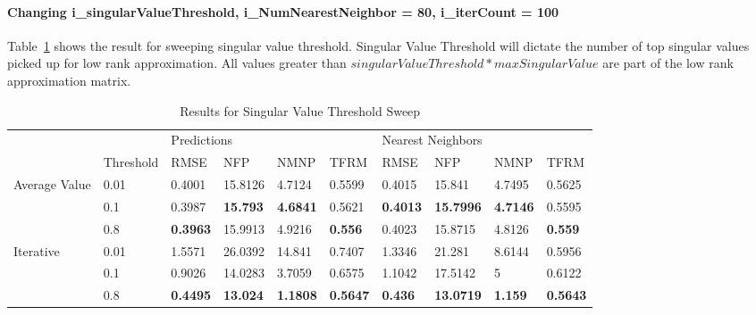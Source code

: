 \begin{enumerate}
\paragraph{Changing i\_singularValueThreshold, i\_NumNearestNeighbor = 80, i\_iterCount = 100}
Table~\ref{tab:SingularValueThresholdSweep} shows the result for sweeping singular value threshold. Singular Value Threshold will dictate the number of top singular values picked up for low rank approximation. All values greater than $singularValueThreshold*maxSingularValue$ are part of the low rank approximation matrix.
\begin{table}[]
\centering
\caption{Results for Singular Value Threshold Sweep}
\label{tab:SingularValueThresholdSweep}
\begin{tabular}{|l|l|l|l|l|l|l|l|l|l|}
\hline
\multirow{2}{*}{}                                              &                          & \multicolumn{4}{l|}{Predictions}   & \multicolumn{4}{l|}{Nearest Neighbors} \\ \cline{2-10} 
                                                               & Threshold & RMSE   & NFP     & NMNP   & TFRM   & RMSE    & NFP      & NMNP    & TFRM    \\ \hline
\multicolumn{1}{|c|}{\multirow{3}{*}{Average Value}} & 0.01      & 0.4001 & 15.8126 & 4.7124 & 0.5599 & 0.4015  & 15.841   & 4.7495  & 0.5625  \\ \cline{2-10} 
\multicolumn{1}{|c|}{}                                         & 0.1       & 0.3987 & \textbf{15.793}  & \textbf{4.6841} & 0.5621 & \textbf{0.4013}  & \textbf{15.7996}  & \textbf{4.7146}  & 0.5595  \\ \cline{2-10} 
\multicolumn{1}{|c|}{}                                         & 0.8       & \textbf{0.3963} & 15.9913 & 4.9216 & \textbf{0.556}  & 0.4023  & 15.8715  & 4.8126  & \textbf{0.559}   \\ \hline
\multirow{3}{*}{Iterative}                     & 0.01      & 1.5571 & 26.0392 & 14.841 & 0.7407 & 1.3346  & 21.281   & 8.6144  & 0.5956  \\ \cline{2-10} 
                                                               & 0.1       & 0.9026 & 14.0283 & 3.7059 & 0.6575 & 1.1042  & 17.5142  & 5       & 0.6122  \\ \cline{2-10} 
                                                               & 0.8       & \textbf{0.4495} & \textbf{13.024}  & \textbf{1.1808} & \textbf{0.5647} & \textbf{0.436}   & \textbf{13.0719}  & \textbf{1.159}   & \textbf{0.5643}  \\ \hline
\end{tabular}
\end{table}


\end{enumerate}
